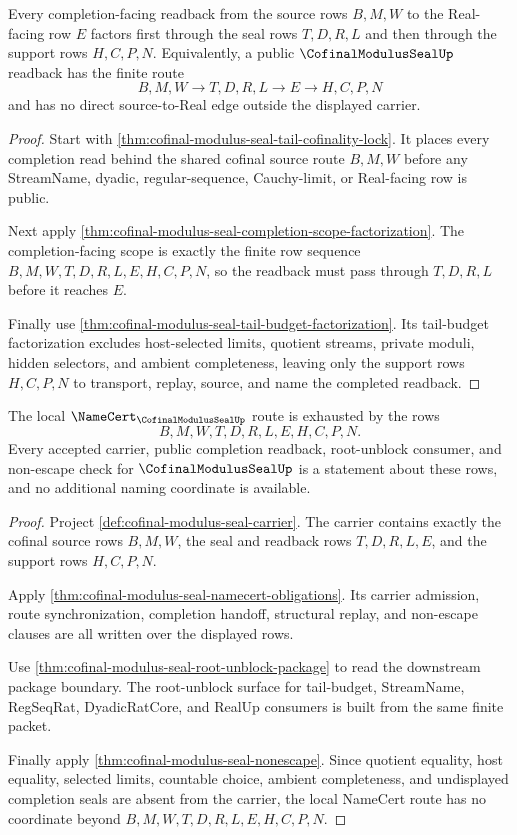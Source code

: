 \begin{theorem}
\label{thm:cofinal-modulus-seal-cofinal-readback-factorization}
Every completion-facing readback from the source rows $B,M,W$ to the Real-facing row $E$ factors first through the seal rows $T,D,R,L$ and then through the support rows $H,C,P,N$. Equivalently, a public $\CofinalModulusSealUp$ readback has the finite route
$$
B,M,W \longrightarrow T,D,R,L \longrightarrow E \longrightarrow H,C,P,N
$$
and has no direct source-to-Real edge outside the displayed carrier.
\end{theorem}
\begin{proof}
Start with \autoref{thm:cofinal-modulus-seal-tail-cofinality-lock}. It places every completion read behind the shared cofinal source route $B,M,W$ before any StreamName, dyadic, regular-sequence, Cauchy-limit, or Real-facing row is public.

Next apply \autoref{thm:cofinal-modulus-seal-completion-scope-factorization}. The completion-facing scope is exactly the finite row sequence $B,M,W,T,D,R,L,E,H,C,P,N$, so the readback must pass through $T,D,R,L$ before it reaches $E$.

Finally use \autoref{thm:cofinal-modulus-seal-tail-budget-factorization}. Its tail-budget factorization excludes host-selected limits, quotient streams, private moduli, hidden selectors, and ambient completeness, leaving only the support rows $H,C,P,N$ to transport, replay, source, and name the completed readback.
\end{proof}

\begin{theorem}
\label{thm:cofinal-modulus-seal-route-namecert-exhaustion}
The local $\NameCert_{\CofinalModulusSealUp}$ route is exhausted by the rows
$$
B,M,W,T,D,R,L,E,H,C,P,N.
$$
Every accepted carrier, public completion readback, root-unblock consumer, and non-escape check for $\CofinalModulusSealUp$ is a statement about these rows, and no additional naming coordinate is available.
\end{theorem}
\begin{proof}
Project \autoref{def:cofinal-modulus-seal-carrier}. The carrier contains exactly the cofinal source rows $B,M,W$, the seal and readback rows $T,D,R,L,E$, and the support rows $H,C,P,N$.

Apply \autoref{thm:cofinal-modulus-seal-namecert-obligations}. Its carrier admission, route synchronization, completion handoff, structural replay, and non-escape clauses are all written over the displayed rows.

Use \autoref{thm:cofinal-modulus-seal-root-unblock-package} to read the downstream package boundary. The root-unblock surface for tail-budget, StreamName, RegSeqRat, DyadicRatCore, and RealUp consumers is built from the same finite packet.

Finally apply \autoref{thm:cofinal-modulus-seal-nonescape}. Since quotient equality, host equality, selected limits, countable choice, ambient completeness, and undisplayed completion seals are absent from the carrier, the local NameCert route has no coordinate beyond $B,M,W,T,D,R,L,E,H,C,P,N$.
\end{proof}

